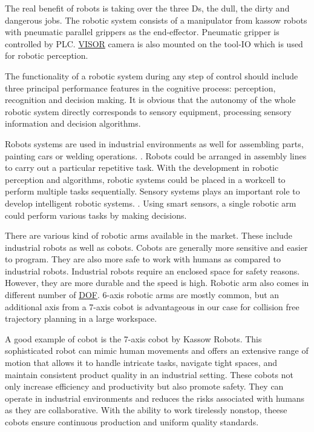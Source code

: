 The real benefit of robots is taking over the three Ds, the dull, the dirty and dangerous jobs. \cite{jordan2016robots}
The robotic system consists of a manipulator from kassow robots with pneumatic parallel grippers as the end-effector.
Pneumatic gripper is controlled by PLC. \hyperref[acro:VISOR]{VISOR\textsuperscript{\textregistered}} camera is also mounted on the tool-IO which is used for robotic perception.

The functionality of a robotic system during any step of control should include three principal performance
features in the cognitive process: perception, recognition and decision making. 
It is obvious that the autonomy of the whole robotic system directly corresponds to sensory equipment, 
processing sensory information and decision algorithms. \cite{HAVLIK2011327}

Robots systems are used in industrial environments as well for assembling parts, painting cars or welding operations. \cite{SathishKumar2023, Wakizako}. Robots could be arranged in assembly lines to carry out a particular repetitive task. With the development in robotic perception and algorithms, robotic systems could be placed in a workcell to perform multiple tasks sequentially.
Sensory systems plays an important role to develop intelligent robotic systems. \cite{Wakizako}. Using smart sensors, a single robotic arm could perform various tasks by making decisions.

There are various  kind of robotic arms available in the market. These include industrial robots as well as cobots. Cobots are generally more sensitive and easier to program. They are also more safe to work with humans as compared to industrial robots. Industrial robots require an enclosed space for safety reasons. However, they are more durable and the speed is high. \cite{10201199}
Robotic arm also comes in different number of \hyperref[acro:DOF]{DOF}. 6-axis robotic arms are mostly common, but an additional axis from a 7-axis cobot is advantageous in our case for collision free trajectory planning in a large workspace. 

A good example of cobot is the 7-axis cobot by Kassow Robots. This sophisticated robot can mimic human movements and offers an extensive range of motion that allows it to handle intricate tasks, navigate tight spaces, and maintain consistent product quality in an industrial setting.
These cobots not only increase efficiency and productivity but also promote safety.
They can operate in industrial environments and reduces the risks associated with humans as they are collaborative. 
With the ability to work tirelessly nonstop, theese cobots ensure continuous production and uniform quality standards.
\cite{kassowrobotsblog}

